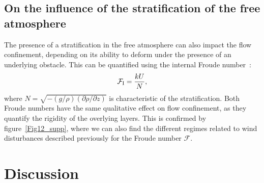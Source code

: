   \subsection{On the influence of the stratification of the free atmosphere}

  The presence of a stratification in the free atmosphere can also impact the flow confinement, depending on its ability to deform under the presence of an underlying obstacle. This can be quantified using the internal Froude number~\citep{Vosper2004, Stull2006, Sheridan2006, Hunt2006, Jiang2014}:
  \begin{equation}
    \mathcal{F}_{\textup{I}} = \displaystyle\frac{k U}{N},
  \end{equation}
  where $N = \sqrt{-(g/\rho)(\partial \rho/\partial z)}$ is characteristic of the stratification. Both Froude numbers have the same qualitative effect on flow confinement, as they quantify the rigidity of the overlying layers. This is confirmed by figure~\ref{Fig12_supp}, where we can also find the different regimes related to wind disturbances described previously for the Froude number $\mathcal{F}$.

\section{Discussion}

